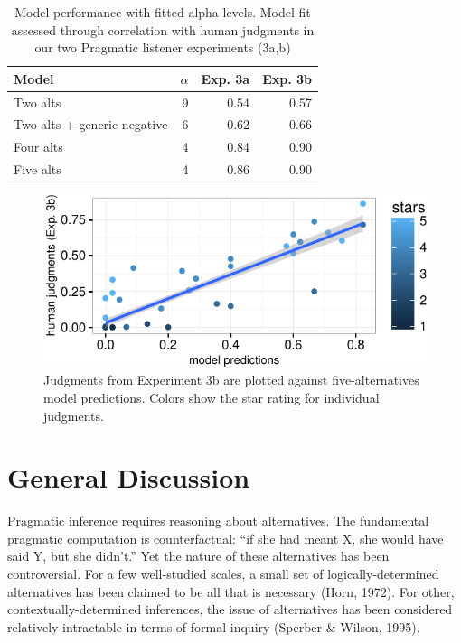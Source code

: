 \documentclass[10pt, letterpaper]{article}
\newenvironment{CodeChunk}{}{}
\begin{document}
\begin{table}[ht]
\centering
\begin{tabular}{lrrr}
  \hline
Model & $\alpha$ & Exp. 3a & Exp. 3b \\ 
  \hline
Two alts &   9 & 0.54 & 0.57 \\ 
  Two alts + generic negative  &   6 & 0.62 & 0.66 \\ 
  Four alts &   4 & 0.84 & 0.90 \\ 
  Five alts &   4 & 0.86 & 0.90 \\ 
   \hline
\end{tabular}
\caption{Model performance with fitted alpha levels. Model fit assessed through correlation with human judgments in our two Pragmatic listener experiments (3a,b)} 
\end{table}

\begin{CodeChunk}
\begin{figure}[t]

{\centering \includegraphics{figs/fiveAltsScatter-1} 

}

\caption[Judgments from Experiment 3b are plotted against five-alternatives model predictions]{Judgments from Experiment 3b are plotted against five-alternatives model predictions. Colors show the star rating for individual judgments.}\label{fig:fiveAltsScatter}
\end{figure}
\end{CodeChunk}

\section{General Discussion}\label{general-discussion}

Pragmatic inference requires reasoning about alternatives. The
fundamental pragmatic computation is counterfactual: ``if she had meant
X, she would have said Y, but she didn't.'' Yet the nature of these
alternatives has been controversial. For a few well-studied scales, a
small set of logically-determined alternatives has been claimed to be
all that is necessary (Horn, 1972). For other, contextually-determined
inferences, the issue of alternatives has been considered relatively
intractable in terms of formal inquiry (Sperber \& Wilson, 1995).
\end{document}
